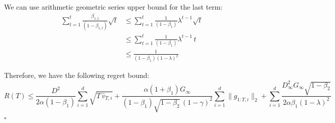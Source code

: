 \documentclass[11pt]{article}
\begin{document}
\noindent
We can use arithmetic geometric series upper bound for the last
term:
\begin{align*}
\sum_{t=1}^{t} \frac{\beta_{1,t}}{(1 - \beta_{1,t})} \sqrt{t}
 &\leq \sum_{t=1}^{t} \frac{1}{(1 - \beta_1)} \lambda^{t-1} \sqrt{t} \\
 &\leq \sum_{t=1}^{t} \frac{1}{(1 - \beta_1)} \lambda^{t-1}\, t \\
 &\leq \frac{1}{(1 - \beta_1)(1 - \lambda)^2}
\end{align*}

\noindent
Therefore, we have the following regret bound:
\[
R(T) \leq \frac{D^2}{2\alpha(1 - \beta_1)}
          \sum_{i=1}^{d} \sqrt{T\,\widehat{v}_{T,i}}
        + \frac{\alpha(1 + \beta_1) G_\infty}
               {(1 - \beta_1)\sqrt{1 - \beta_2}\,(1 - \gamma)^2}
          \sum_{i=1}^{d} \|g_{1:T,i}\|_2
        + \sum_{i=1}^{d}
          \frac{D_\infty^2 G_\infty \sqrt{1 - \beta_2}}
               {2\alpha \beta_1 (1 - \lambda)^2}
\]
\hfill$\square$

\end{document}
